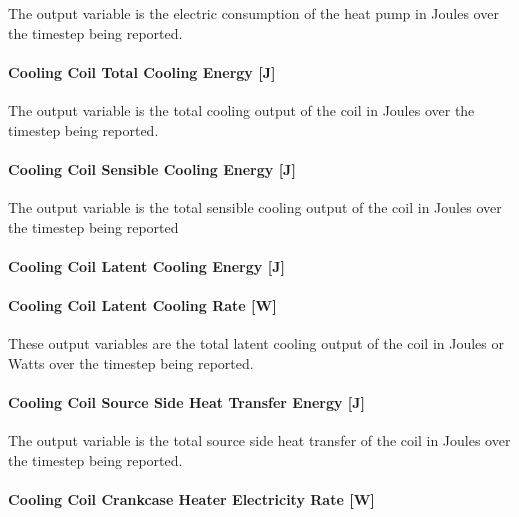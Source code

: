 The output variable is the electric consumption of the heat pump in Joules over the timestep being reported.

\paragraph{Cooling Coil Total Cooling Energy {[}J{]}}\label{cooling-coil-total-cooling-energy-j-5}

The output variable is the total cooling output of the coil in Joules over the timestep being reported.

\paragraph{Cooling Coil Sensible Cooling Energy {[}J{]}}\label{cooling-coil-sensible-cooling-energy-j-5}

The output variable is the total sensible cooling output of the coil in Joules over the timestep being reported

\paragraph{Cooling Coil Latent Cooling Energy {[}J{]}}\label{cooling-coil-latent-cooling-energy-j-3}

\paragraph{Cooling Coil Latent Cooling Rate {[}W{]}}\label{cooling-coil-latent-cooling-rate-w-3}

These output variables are the total latent cooling output of the coil in Joules or Watts over the timestep being reported.

\paragraph{Cooling Coil Source Side Heat Transfer Energy {[}J{]}}\label{cooling-coil-source-side-heat-transfer-energy-j-2}

The output variable is the total source side heat transfer of the coil in Joules over the timestep being reported.

\paragraph{Cooling Coil Crankcase Heater Electricity Rate {[}W{]}}\label{cooling-coil-crankcase-heater-electric-power-w}

